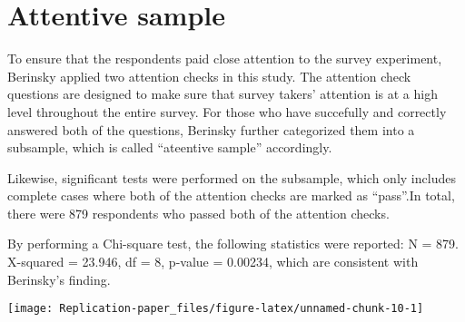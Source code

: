 \documentclass[AER]{AEA}
\begin{document}
\hypertarget{attentive-sample}{%
\section{Attentive sample}\label{attentive-sample}}

To ensure that the respondents paid close attention to the survey
experiment, Berinsky applied two attention checks in this study. The
attention check questions are designed to make sure that survey takers'
attention is at a high level throughout the entire survey. For those who
have succefully and correctly answered both of the questions, Berinsky
further categorized them into a subsample, which is called ``ateentive
sample'' accordingly.

Likewise, significant tests were performed on the subsample, which only
includes complete cases where both of the attention checks are marked as
``pass''.In total, there were 879 respondents who passed both of the
attention checks.

\begin{table}

\caption{\label{tab:attentive sample}Attentive sample}
\centering
{}
\end{table}

By performing a Chi-square test, the following statistics were reported:
N = 879. X-squared = 23.946, df = 8, p-value = 0.00234, which are
consistent with Berinsky's finding.

\begin{center}\texttt{[image: Replication-paper\_files/figure-latex/unnamed-chunk-10-1]} \end{center}
\end{document}
